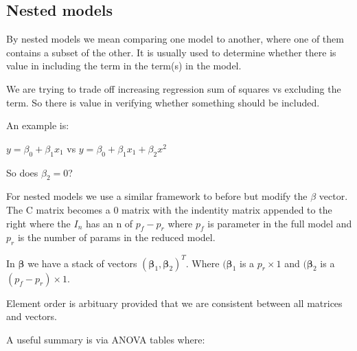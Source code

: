 \documentclass[
  letterpaper,
  DIV=11,
  numbers=noendperiod]{scrreprt}
\begin{document}
\hypertarget{nested-models}{%
\subsection{Nested models}\label{nested-models}}

By nested models we mean comparing one model to another, where one of
them contains a subset of the other. It is usually used to determine
whether there is value in including the term in the term(s) in the
model.

We are trying to trade off increasing regression sum of squares vs
excluding the term. So there is value in verifying whether something
should be included.

An example is:

\(y= \beta_0 + \beta_1x_1\) vs \(y= \beta_0 + \beta_1x_1 + \beta_2 x^2\)

So does \(\beta_2 = 0\)?

For nested models we use a similar framework to before but modify the
\(\beta\) vector. The C matrix becomes a 0 matrix with the indentity
matrix appended to the right where the \(I_n\) has an n of \(p_f - p_r\)
where \(p_f\) is parameter in the full model and \(p_r\) is the number
of params in the reduced model.

In \(\boldsymbol{\beta}\) we have a stack of vectors
\((\boldsymbol{\beta}_1, \boldsymbol{\beta}_2)^T\). Where
\((\boldsymbol{\beta}_1\) is a \(p_r \times 1\) and
\((\boldsymbol{\beta}_2\) is a \((p_f - p_r) \times 1\).

Element order is arbituary provided that we are consistent between all
matrices and vectors.

A useful summary is via ANOVA tables where:
\end{document}

